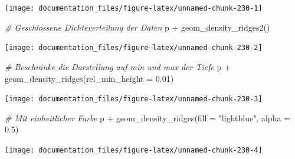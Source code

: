 \documentclass[
]{article}
\newenvironment{Shaded}{\begin{snugshade}}{\end{snugshade}}
\newcommand{\AttributeTok}[1]{\textcolor[rgb]{0.77,0.63,0.00}{#1}}
\newcommand{\CommentTok}[1]{\textcolor[rgb]{0.56,0.35,0.01}{\textit{#1}}}
\newcommand{\FloatTok}[1]{\textcolor[rgb]{0.00,0.00,0.81}{#1}}
\newcommand{\FunctionTok}[1]{\textcolor[rgb]{0.00,0.00,0.00}{#1}}
\newcommand{\NormalTok}[1]{#1}
\newcommand{\SpecialCharTok}[1]{\textcolor[rgb]{0.00,0.00,0.00}{#1}}
\newcommand{\StringTok}[1]{\textcolor[rgb]{0.31,0.60,0.02}{#1}}
\begin{document}
\begin{center}\texttt{[image: documentation\_files/figure-latex/unnamed-chunk-230-1]} \end{center}

\begin{Shaded}
\begin{Highlighting}[]
\CommentTok{\# Geschlossene Dichteverteilung der Daten}
\NormalTok{p }\SpecialCharTok{+} \FunctionTok{geom\_density\_ridges2}\NormalTok{()}
\end{Highlighting}
\end{Shaded}

\begin{center}\texttt{[image: documentation\_files/figure-latex/unnamed-chunk-230-2]} \end{center}

\begin{Shaded}
\begin{Highlighting}[]
\CommentTok{\# Beschränke die Darstellung auf min und max der Tiefe}
\NormalTok{p }\SpecialCharTok{+} \FunctionTok{geom\_density\_ridges}\NormalTok{(}\AttributeTok{rel\_min\_height =} \FloatTok{0.01}\NormalTok{)}
\end{Highlighting}
\end{Shaded}

\begin{center}\texttt{[image: documentation\_files/figure-latex/unnamed-chunk-230-3]} \end{center}

\begin{Shaded}
\begin{Highlighting}[]
\CommentTok{\# Mit einheitlicher Farbe}
\NormalTok{p }\SpecialCharTok{+} \FunctionTok{geom\_density\_ridges}\NormalTok{(}\AttributeTok{fill =} \StringTok{"lightblue"}\NormalTok{, }\AttributeTok{alpha =} \FloatTok{0.5}\NormalTok{)}
\end{Highlighting}
\end{Shaded}

\begin{center}\texttt{[image: documentation\_files/figure-latex/unnamed-chunk-230-4]} \end{center}
\end{document}
